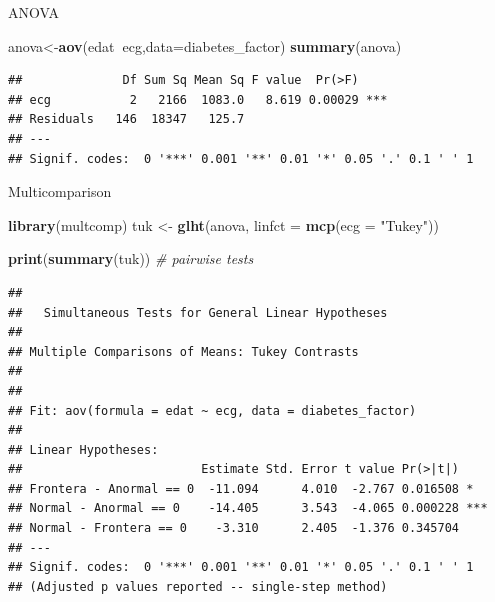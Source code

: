 \documentclass[
  ignorenonframetext,
]{beamer}
\newenvironment{Shaded}{\begin{snugshade}}{\end{snugshade}}
\newcommand{\CommentTok}[1]{\textcolor[rgb]{0.56,0.35,0.01}{\textit{#1}}}
\newcommand{\DataTypeTok}[1]{\textcolor[rgb]{0.13,0.29,0.53}{#1}}
\newcommand{\KeywordTok}[1]{\textcolor[rgb]{0.13,0.29,0.53}{\textbf{#1}}}
\newcommand{\NormalTok}[1]{#1}
\newcommand{\OperatorTok}[1]{\textcolor[rgb]{0.81,0.36,0.00}{\textbf{#1}}}
\newcommand{\StringTok}[1]{\textcolor[rgb]{0.31,0.60,0.02}{#1}}
\begin{document}
\begin{frame}[fragile]{ANOVA}
\protect\hypertarget{anova}{}

\begin{Shaded}
\begin{Highlighting}[]
\NormalTok{anova<-}\KeywordTok{aov}\NormalTok{(edat}\OperatorTok{~}\NormalTok{ecg,}\DataTypeTok{data=}\NormalTok{diabetes_factor)}
\KeywordTok{summary}\NormalTok{(anova)}
\end{Highlighting}
\end{Shaded}

\begin{verbatim}
##              Df Sum Sq Mean Sq F value  Pr(>F)    
## ecg           2   2166  1083.0   8.619 0.00029 ***
## Residuals   146  18347   125.7                    
## ---
## Signif. codes:  0 '***' 0.001 '**' 0.01 '*' 0.05 '.' 0.1 ' ' 1
\end{verbatim}

\end{frame}

\begin{frame}[fragile]{Multicomparison}
\protect\hypertarget{multicomparison}{}

\tiny

\begin{Shaded}
\begin{Highlighting}[]
\KeywordTok{library}\NormalTok{(multcomp)}
\NormalTok{tuk <-}\StringTok{ }\KeywordTok{glht}\NormalTok{(anova, }\DataTypeTok{linfct =} \KeywordTok{mcp}\NormalTok{(}\DataTypeTok{ecg =} \StringTok{"Tukey"}\NormalTok{))}

  \KeywordTok{print}\NormalTok{(}\KeywordTok{summary}\NormalTok{(tuk)) }\CommentTok{# pairwise tests}
\end{Highlighting}
\end{Shaded}

\begin{verbatim}
## 
##   Simultaneous Tests for General Linear Hypotheses
## 
## Multiple Comparisons of Means: Tukey Contrasts
## 
## 
## Fit: aov(formula = edat ~ ecg, data = diabetes_factor)
## 
## Linear Hypotheses:
##                         Estimate Std. Error t value Pr(>|t|)    
## Frontera - Anormal == 0  -11.094      4.010  -2.767 0.016508 *  
## Normal - Anormal == 0    -14.405      3.543  -4.065 0.000228 ***
## Normal - Frontera == 0    -3.310      2.405  -1.376 0.345704    
## ---
## Signif. codes:  0 '***' 0.001 '**' 0.01 '*' 0.05 '.' 0.1 ' ' 1
## (Adjusted p values reported -- single-step method)
\end{verbatim}

\end{frame}
\end{document}
